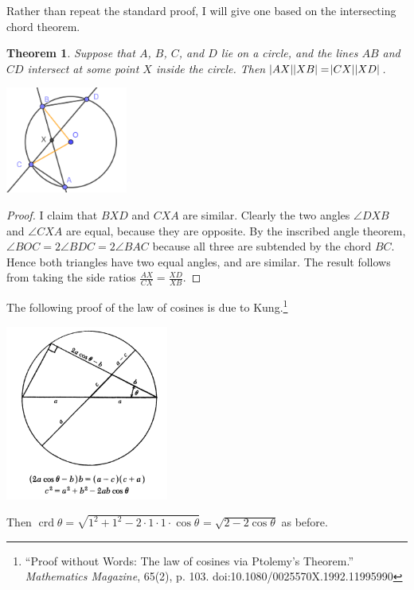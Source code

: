 \documentclass[a4paper,leqno]{article}
\numberwithin{equation}{section}
\newtheorem{thm}[equation]{Theorem}
\theoremstyle{definition}
\theoremstyle{remark}
\DeclareMathOperator{\crd}{crd}
\begin{document}
Rather than repeat the standard proof, I will give one based on the intersecting chord theorem.
\begin{thm}
  Suppose that $ A $, $ B $, $ C $, and $ D $ lie on a circle, and the lines $ AB $ and $ CD $ intersect at
  some point $ X $ inside the circle. Then $ \abs{AX} \abs{XB} = \abs{CX} \abs{XD} $.
\end{thm}
\begin{center}
  \includegraphics[width=0.3\textwidth]{ichords}
\end{center}
\begin{proof}
  I claim that $ BXD $ and $ CXA $ are similar. Clearly the two angles $ \angle DXB $ and $ \angle CXA $ are
  equal, because they are opposite. By the inscribed angle theorem, $ \angle BOC = 2\angle BDC = 2\angle BAC $
  because all three are subtended by the chord $ BC $. Hence both triangles have two equal angles, and are similar.
  The result follows from taking the side ratios $ \frac{AX}{CX} = \frac{XD}{XB} $.
\end{proof}

The following proof of the law of cosines is due to Kung.\footnote{``Proof without Words: The law of cosines via Ptolemy's Theorem.'' \textit{Mathematics Magazine}, 65(2), p. 103. doi:10.1080/0025570X.1992.11995990}
\begin{center}
  \includegraphics[width=0.4\textwidth]{cosinelawproof}
\end{center}

Then $ \crd \theta = \sqrt{1^2 + 1^2 - 2\cdot1\cdot1\cdot \cos \theta} = \sqrt{2 - 2\cos \theta} $ as before.
\end{document}

